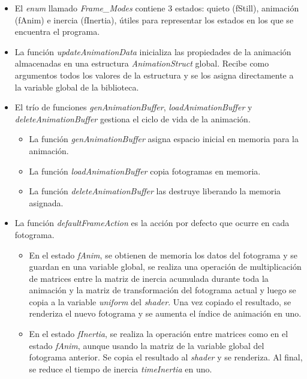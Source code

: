 \begin{itemize}

    \item El \textit{enum} llamado \textit{Frame\_Modes} contiene 3 estados: quieto (fStill), animación (fAnim) e inercia (fInertia), útiles para representar los estados en los que se encuentra el programa.

    \item La función \textit{updateAnimationData} inicializa las propiedades de la animación almacenadas en una estructura \textit{AnimationStruct} global. Recibe como argumentos todos los valores de la estructura y se los asigna directamente a la variable global de la biblioteca.

    \item El trío de funciones \textit{genAnimationBuffer}, \textit{loadAnimationBuffer} y \textit{deleteAnimationBuffer} gestiona el ciclo de vida de la animación.
        \begin{itemize}
            \item La función \textit{genAnimationBuffer} asigna espacio inicial en memoria para la animación.
            \item La función \textit{loadAnimationBuffer} copia fotogramas en memoria. 
            \item La función \textit{deleteAnimationBuffer} las destruye liberando la memoria asignada.
        \end{itemize}
    
    \item La función \textit{defaultFrameAction} es la acción por defecto que ocurre en cada fotograma.
    
    \begin{itemize}
        \item En el estado \textit{fAnim}, se obtienen de memoria los datos del fotograma y se guardan en una variable global, se realiza una operación de multiplicación de matrices entre la matriz de inercia acumulada durante toda la animación y la matriz de transformación del fotograma actual y luego se copia a la variable \textit{uniform} del \textit{shader}. Una vez copiado el resultado, se renderiza el nuevo fotograma y se aumenta el índice de animación en uno.

        \item En el estado \textit{fInertia}, se realiza la operación entre matrices como en el estado \textit{fAnim}, aunque usando la matriz de la variable global del fotograma anterior. Se copia el resultado al \textit{shader} y se renderiza. Al final, se reduce el tiempo de inercia \textit{timeInertia} en uno.


\end{itemize}
\end{itemize}
